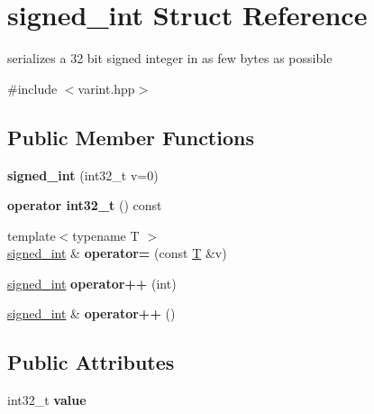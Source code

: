 \hypertarget{structsigned__int}{}\section{signed\+\_\+int Struct Reference}
\label{structsigned__int}


serializes a 32 bit signed integer in as few bytes as possible  




{\ttfamily \#include $<$varint.\+hpp$>$}

\subsection*{Public Member Functions}
\begin{DoxyCompactItemize}
\item 
\mbox{\label{structsigned__int_aeb8e4505fb74ac10c901ef905ff82d2e}} 
{\bfseries signed\+\_\+int} (int32\+\_\+t v=0)
\item 
\mbox{\label{structsigned__int_afe5db7c1297bb56cc454fe413959c07c}} 
{\bfseries operator int32\+\_\+t} () const
\item 
\mbox{\label{structsigned__int_a94d683e2056158e266f64ac0cd60ecaf}} 
{\footnotesize template$<$typename T $>$ }\\\mbox{\hyperlink{structsigned__int}{signed\+\_\+int}} \& {\bfseries operator=} (const \mbox{\hyperlink{struct_t}{T}} \&v)
\item 
\mbox{\label{structsigned__int_a21a8dab0e714a1bac2cbd91810ac6a77}} 
\mbox{\hyperlink{structsigned__int}{signed\+\_\+int}} {\bfseries operator++} (int)
\item 
\mbox{\label{structsigned__int_a364a6dedb3372b0c318d0954ba0909d3}} 
\mbox{\hyperlink{structsigned__int}{signed\+\_\+int}} \& {\bfseries operator++} ()
\end{DoxyCompactItemize}
\subsection*{Public Attributes}
\begin{DoxyCompactItemize}
\item 
\mbox{\label{structsigned__int_aa943a3c55006fb2cc4e88afd6edc1755}} 
int32\+\_\+t {\bfseries value}
\end{DoxyCompactItemize}
